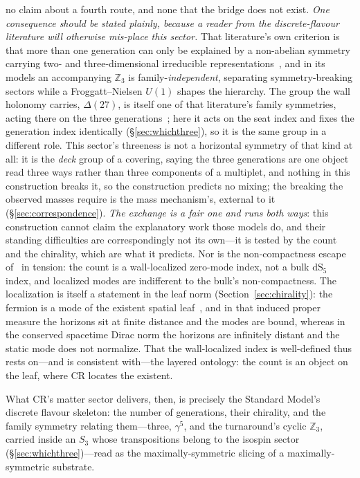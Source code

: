 \documentclass[11pt]{article}
\newcommand{\dS}{\mathrm{dS}}
\begin{document}
no claim about a fourth route, and none that the bridge does not exist. \emph{One consequence should be stated plainly, because a reader from the discrete-flavour literature will otherwise mis-place this sector.} That literature's own criterion is that more than one generation can only be explained by a non-abelian symmetry carrying two- and three-dimensional irreducible representations~\cite{IshimoriEtAl2010}, and in its models an accompanying $\mathbb{Z}_3$ is family-\emph{independent}, separating symmetry-breaking sectors while a Froggatt--Nielsen $U(1)$ shapes the hierarchy. The group the wall holonomy carries, $\Delta(27)$, is itself one of that literature's family symmetries, acting there on the three generations~\cite{BrancoGerardGrimus1984,IshimoriEtAl2010}; here it acts on the seat index and fixes the generation index identically (\S\ref{sec:whichthree}), so it is the same group in a different role. This sector's threeness is not a horizontal symmetry of that kind at all: it is the \emph{deck} group of a covering, saying the three generations are one object read three ways rather than three components of a multiplet, and nothing in this construction breaks it, so the construction predicts no mixing; the breaking the observed masses require is the mass mechanism's, external to it (\S\ref{sec:correspondence}). \emph{The exchange is a fair one and runs both ways}: this construction cannot claim the explanatory work those models do, and their standing difficulties are correspondingly not its own---it is tested by the count and the chirality, which are what it predicts. Nor is the non-compactness escape of~\cite{JanzenBoundary} in tension: the count is a wall-localized zero-mode index, not a bulk $\dS_5$ index, and localized modes are indifferent to the bulk's non-compactness. The localization is itself a statement in the leaf norm (Section~\ref{sec:chirality}): the fermion is a mode of the existent spatial leaf~\cite{JanzenCRframework}, and in that induced proper measure the horizons sit at finite distance and the modes are bound, whereas in the conserved spacetime Dirac norm the horizons are infinitely distant and the static mode does not normalize. That the wall-localized index is well-defined thus rests on---and is consistent with---the layered ontology: the count is an object on the leaf, where CR locates the existent.

What CR's matter sector delivers, then, is precisely the Standard Model's discrete flavour skeleton: the number of generations, their chirality, and the family symmetry relating them---three, $\gamma^5$, and the turnaround's cyclic $\mathbb{Z}_3$, carried inside an $S_3$ whose transpositions belong to the isospin sector (\S\ref{sec:whichthree})---read as the maximally-symmetric slicing of a maximally-symmetric substrate.
\end{document}
